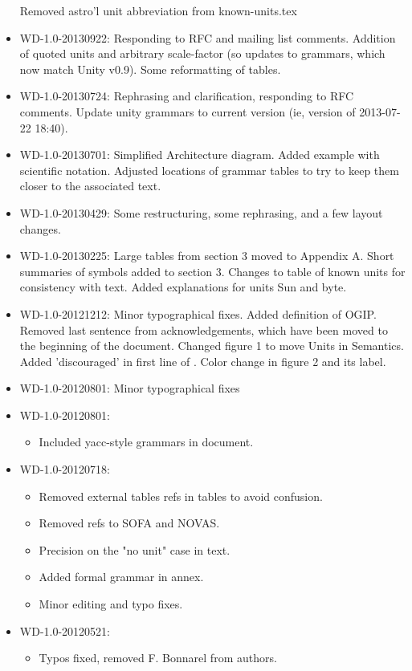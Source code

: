 \documentclass[11pt,a4paper]{ivoa}
\begin{document}
\begin{itemize}
Removed astro'l unit abbreviation from known-units.tex
\item WD-1.0-20130922: Responding to RFC and mailing list comments.
Addition of quoted units and arbitrary scale-factor (so updates to
grammars, which now match Unity v0.9).  Some reformatting of tables.
\item WD-1.0-20130724: Rephrasing and clarification, responding to RFC
comments.  Update unity grammars to current version (ie, version of 2013-07-22 18:40).
\item WD-1.0-20130701: Simplified Architecture diagram. Added example
with scientific notation.  Adjusted locations of grammar tables to try
to keep them closer to the associated text.
\item WD-1.0-20130429: Some restructuring, some rephrasing, and a few layout changes.
\item WD-1.0-20130225: Large tables from section 3 moved to Appendix A. Short summaries of symbols added
to section 3. Changes to table of known units for consistency with text. Added explanations for units Sun and byte.
\item WD-1.0-20121212:
Minor typographical fixes. Added definition of OGIP. Removed last sentence from acknowledgements, which have been moved to the beginning of the document. Changed figure 1 to move Units in Semantics. Added 'discouraged' in first line of . Color change in figure 2 and its label.
\item WD-1.0-20120801:
Minor typographical fixes
\item WD-1.0-20120801:
  \begin{itemize}
    \item Included yacc-style grammars in document.
    \end{itemize}
\item WD-1.0-20120718:
	\begin{itemize}
	\item Removed external tables refs in tables to avoid confusion.
	\item Removed refs to SOFA and NOVAS.
	\item Precision on the "no unit" case in text.
	\item Added formal grammar in annex.
	\item Minor editing and typo fixes.
	\end{itemize}
\item WD-1.0-20120521:
	\begin{itemize}
	\item Typos fixed, removed F. Bonnarel from authors.

\end{itemize}
\end{itemize}
\end{document}
